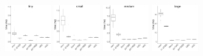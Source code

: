 \documentclass[../document.tex]{subfiles}
\begin{document}
\begin{figure}
	\begin{subfigure}{0.09\textwidth} \label{fig:time-fft} \vspace{5mm}\end{subfigure}
	\begin{subfigure}{0.9\textwidth}
		\includegraphics[width=0.22\textwidth]{figures/time-results/generate_fft_tiny_boxplot-1}
		\includegraphics[width=0.22\textwidth]{figures/time-results/generate_fft_small_boxplot-1}
		\includegraphics[width=0.22\textwidth]{figures/time-results/generate_fft_medium_boxplot-1}
		\includegraphics[width=0.22\textwidth]{figures/time-results/generate_fft_large_boxplot-1}
		\end{subfigure}


\end{figure}
\end{document}

